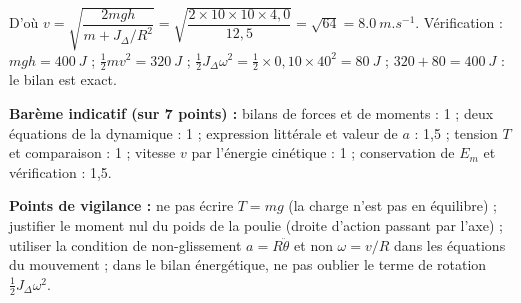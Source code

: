 \documentclass[11pt]{article}
\begin{document}
\begin{corrige}
\begin{enumerate}
D'où $v = \sqrt{\dfrac{2mgh}{m + J_\Delta/R^2}} = \sqrt{\dfrac{2 \times 10 \times 10 \times 4{,}0}{12{,}5}} = \sqrt{64} = \SI{8,0}{m.s^{-1}}$. Vérification : $mgh = \SI{400}{J}$ ; $\tfrac{1}{2}mv^2 = \SI{320}{J}$ ; $\tfrac{1}{2}J_\Delta\omega^2 = \tfrac{1}{2} \times 0{,}10 \times 40^2 = \SI{80}{J}$ ; $320 + 80 = \SI{400}{J}$ : le bilan est exact.
\end{enumerate}
\textbf{Barème indicatif (sur 7 points) :} bilans de forces et de moments : 1 ; deux équations de la dynamique : 1 ; expression littérale et valeur de $a$ : 1,5 ; tension $T$ et comparaison : 1 ; vitesse $v$ par l'énergie cinétique : 1 ; conservation de $E_m$ et vérification : 1,5.

\textbf{Points de vigilance :} ne pas écrire $T = mg$ (la charge n'est pas en équilibre) ; justifier le moment nul du poids de la poulie (droite d'action passant par l'axe) ; utiliser la condition de non-glissement $a = R\ddot{\theta}$ et non $\omega = v/R$ dans les équations du mouvement ; dans le bilan énergétique, ne pas oublier le terme de rotation $\tfrac{1}{2}J_\Delta\omega^2$.
\end{corrige}
\end{document}
